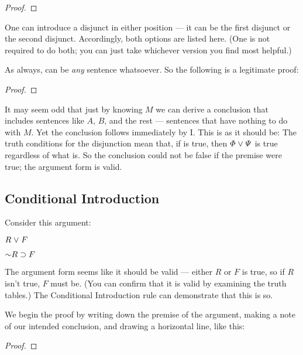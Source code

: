 \begin{proof}
	\metaA{}
\end{proof}

One can introduce a disjunct in either position --- it can be the first disjunct or the second disjunct. Accordingly, both options are listed here. (One is not required to do both; you can just take whichever version you find most helpful.)

As always, \metaB{} can be \emph{any} sentence whatsoever. So the following is a legitimate proof:

\begin{proof}
\end{proof}

It may seem odd that just by knowing $M$ we can derive a conclusion that includes sentences like $A$, $B$, and the rest --- sentences that have nothing to do with $M$. Yet the conclusion follows immediately by {\eor}I. This is as it should be: The truth conditions for the disjunction mean that, if \metaA{} is true, then $\varPhi{}\mkern1mu\vee\mkern1mu \varPsi{}$ is true regardless of what \metaB{} is. So the conclusion could not be false if the premise were true; the argument form is valid.



\subsection{Conditional Introduction}

Consider this argument:
\begin{earg}
\item[] $R \mkern1mu\vee\mkern1mu F$
\item[\therefore] $\enot R \eif F$
\end{earg}
The argument form seems like it should be valid --- either $R$ or $F$ is true, so if $R$ isn't true, $F$ must be. (You can confirm that it is valid by examining the truth tables.) The Conditional Introduction rule can demonstrate that this is so.

We begin the proof by writing down the premise of the argument, making a note of our intended conclusion, and drawing a horizontal line, like this:

\begin{proof}
	 
\end{proof}

